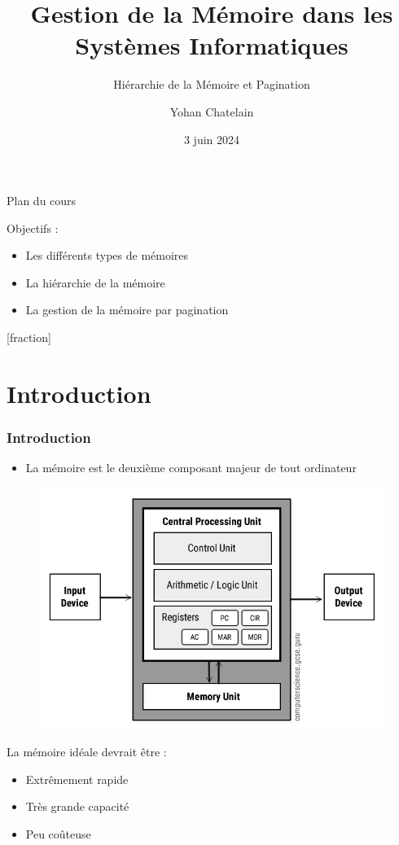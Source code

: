 \documentclass[8pt]{beamer}
\title{Gestion de la Mémoire dans les Systèmes Informatiques}
\subtitle{Hiérarchie de la Mémoire et Pagination}
\author{Yohan Chatelain}
\institute{Polytechnique Montr\'eal}
\date{3 juin 2024}
\begin{document}
\begin{frame}
    \titlepage
\end{frame}

\begin{frame}{Plan du cours}
    \begin{block}{Objectifs : }

        \begin{itemize}
            \item Les différents types de mémoires
            \item La hiérarchie de la mémoire
            \item La gestion de la mémoire par pagination
        \end{itemize}
    \end{block}
\end{frame}

\addtocounter{framenumber}{-2}
[fraction]

\section*{Introduction}
\begin{frame}
    \frametitle{Introduction}
    \begin{itemize}
        \item La mémoire est le deuxième composant majeur de tout ordinateur
    \end{itemize}
    \begin{figure}
        \centering

        \includegraphics[width=.45\textwidth]{figures/Von-Neumann-Architecture-Diagram.jpg}
        \label{fig:sub1}
    \end{figure}
    \begin{block}{La mémoire idéale devrait être :}
        \begin{itemize}
            \item Extrêmement rapide
            \item Très grande capacité
            \item Peu coûteuse
        \end{itemize}
    \end{block}

\end{frame}
\end{document}

